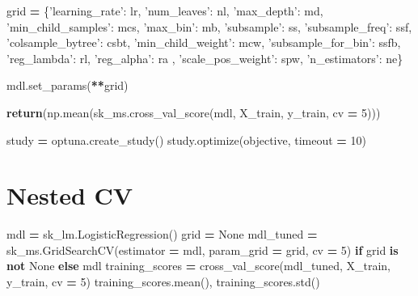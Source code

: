\documentclass[]{book}
\newenvironment{Shaded}{\begin{snugshade}}{\end{snugshade}}
\newcommand{\ControlFlowTok}[1]{\textcolor[rgb]{0.13,0.29,0.53}{\textbf{#1}}}
\newcommand{\DecValTok}[1]{\textcolor[rgb]{0.00,0.00,0.81}{#1}}
\newcommand{\KeywordTok}[1]{\textcolor[rgb]{0.13,0.29,0.53}{\textbf{#1}}}
\newcommand{\NormalTok}[1]{#1}
\newcommand{\OperatorTok}[1]{\textcolor[rgb]{0.81,0.36,0.00}{\textbf{#1}}}
\newcommand{\StringTok}[1]{\textcolor[rgb]{0.31,0.60,0.02}{#1}}
\newcommand{\VariableTok}[1]{\textcolor[rgb]{0.00,0.00,0.00}{#1}}
\begin{document}
\begin{Shaded}
\begin{Highlighting}[]
\NormalTok{    grid }\OperatorTok{=}\NormalTok{ \{}\StringTok{'learning_rate'}\NormalTok{: lr,}
            \StringTok{'num_leaves'}\NormalTok{: nl, }
            \StringTok{'max_depth'}\NormalTok{: md, }
            \StringTok{'min_child_samples'}\NormalTok{: mcs,}
            \StringTok{'max_bin'}\NormalTok{: mb, }
            \StringTok{'subsample'}\NormalTok{: ss,}
            \StringTok{'subsample_freq'}\NormalTok{: ssf, }
            \StringTok{'colsample_bytree'}\NormalTok{: csbt,}
            \StringTok{'min_child_weight'}\NormalTok{: mcw,}
            \StringTok{'subsample_for_bin'}\NormalTok{: ssfb,}
            \StringTok{'reg_lambda'}\NormalTok{: rl,}
            \StringTok{'reg_alpha'}\NormalTok{: ra ,}
            \StringTok{'scale_pos_weight'}\NormalTok{: spw,}
            \StringTok{'n_estimators'}\NormalTok{: ne\}}
    
\NormalTok{    mdl.set_params(}\OperatorTok{**}\NormalTok{grid)}

    \ControlFlowTok{return}\NormalTok{(np.mean(sk_ms.cross_val_score(mdl, X_train, y_train, cv }\OperatorTok{=} \DecValTok{5}\NormalTok{)))}

\NormalTok{study }\OperatorTok{=}\NormalTok{ optuna.create_study()}
\NormalTok{study.optimize(objective, timeout }\OperatorTok{=} \DecValTok{10}\NormalTok{)}
\end{Highlighting}
\end{Shaded}

\hypertarget{nested-cv}{%
\section{Nested CV}\label{nested-cv}}

\begin{Shaded}
\begin{Highlighting}[]
\NormalTok{mdl }\OperatorTok{=}\NormalTok{ sk_lm.LogisticRegression()}
\NormalTok{grid }\OperatorTok{=} \VariableTok{None}
\NormalTok{mdl_tuned }\OperatorTok{=}\NormalTok{ sk_ms.GridSearchCV(estimator }\OperatorTok{=}\NormalTok{ mdl, param_grid }\OperatorTok{=}\NormalTok{ grid, cv }\OperatorTok{=} \DecValTok{5}\NormalTok{) }\ControlFlowTok{if}\NormalTok{ grid }\KeywordTok{is} \KeywordTok{not} \VariableTok{None} \ControlFlowTok{else}\NormalTok{ mdl}
\NormalTok{training_scores }\OperatorTok{=}\NormalTok{ cross_val_score(mdl_tuned, X_train, y_train, cv }\OperatorTok{=} \DecValTok{5}\NormalTok{)}
\NormalTok{training_scores.mean(), training_scores.std()}
\end{Highlighting}
\end{Shaded}
\end{document}
